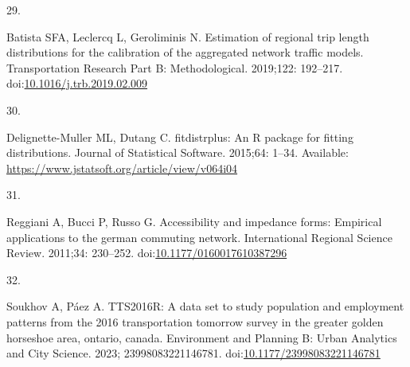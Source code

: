 \documentclass[10pt,letterpaper]{article}
\newlength{\cslhangindent}
\newlength{\csllabelwidth}
\newlength{\cslentryspacingunit} %
\newenvironment{CSLReferences}[2] %
 {%
  \setlength{\parindent}{0pt}
  \ifodd #1
  \let\oldpar\par
  \def\par{\hangindent=\cslhangindent\oldpar}
  \fi
  \setlength{\parskip}{#2\cslentryspacingunit}
 }%
 {}
\newcommand{\CSLLeftMargin}[1]{\parbox[t]{\csllabelwidth}{#1}}
\newcommand{\CSLRightInline}[1]{\parbox[t]{\linewidth - \csllabelwidth}{#1}\break}
\begin{document}
\begin{CSLReferences}{0}{0}
\leavevmode{}%
\CSLLeftMargin{29. }%
\CSLRightInline{Batista SFA, Leclercq L, Geroliminis N. Estimation of
regional trip length distributions for the calibration of the aggregated
network traffic models. Transportation Research Part B: Methodological.
2019;122: 192--217.
doi:\href{https://doi.org/10.1016/j.trb.2019.02.009}{10.1016/j.trb.2019.02.009}}

\leavevmode{}%
\CSLLeftMargin{30. }%
\CSLRightInline{Delignette-Muller ML, Dutang C. {fitdistrplus}: An {R}
package for fitting distributions. Journal of Statistical Software.
2015;64: 1--34. Available:
\url{https://www.jstatsoft.org/article/view/v064i04}}

\leavevmode{}%
\CSLLeftMargin{31. }%
\CSLRightInline{Reggiani A, Bucci P, Russo G. Accessibility and
impedance forms: Empirical applications to the german commuting network.
International Regional Science Review. 2011;34: 230--252.
doi:\href{https://doi.org/10.1177/0160017610387296}{10.1177/0160017610387296}}

\leavevmode{}%
\CSLLeftMargin{32. }%
\CSLRightInline{Soukhov A, Páez A. {TTS}2016R: A data set to study
population and employment patterns from the 2016 transportation tomorrow
survey in the greater golden horseshoe area, ontario, canada.
Environment and Planning B: Urban Analytics and City Science. 2023;
23998083221146781.
doi:\href{https://doi.org/10.1177/23998083221146781}{10.1177/23998083221146781}}

\end{CSLReferences}

\nolinenumbers
\end{document}
